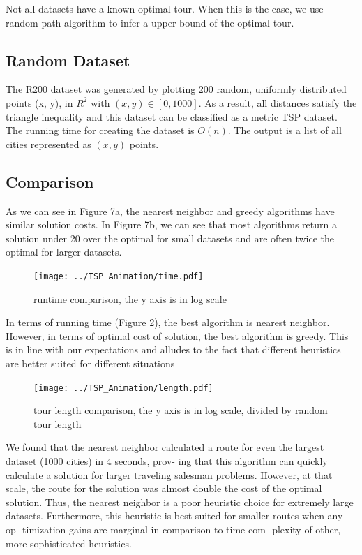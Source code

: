 \documentclass[10pt,twocolumn,letterpaper]{article}
\begin{document}
Not all datasets have a known optimal tour. When this is the case, we use random path algorithm to infer a upper bound of the optimal tour. 

\subsection{Random Dataset}
The R200 dataset was generated by plotting 200 random, 
uniformly distributed points (x, y), in $R^2$ with $(x, y) \in
[0, 1000]$. As a result, all
distances satisfy the triangle inequality and this dataset can
be classified as a metric TSP dataset. The running time
for creating the dataset is $O(n)$. 
The output is a list of all cities represented as $(x,y)$ points.

\subsection{Comparison}
As we can see in Figure 7a, the nearest neighbor and
greedy algorithms have similar solution costs. In Figure 7b,
we can see that most algorithms return a solution under 20%
over the optimal for small datasets and are often twice the
optimal for larger datasets.
\begin{figure}
\centering
\texttt{[image: ../TSP\_Animation/time.pdf]}
\caption{runtime comparison, the y axis is in log scale}
\label{fig:tsp}
\end{figure}

In terms of running time (Figure \ref{fig:length}), the best algorithm
is nearest neighbor. However, in terms of optimal cost of
solution, the best algorithm is greedy. This is in line with our
expectations and alludes to the fact that different heuristics
are better suited for different situations
\begin{figure}
	\centering
	\texttt{[image: ../TSP\_Animation/length.pdf]}
	\caption{tour length comparison, the y axis is in log scale, divided by random tour length}
	\label{fig:length}
\end{figure}
We found that the nearest neighbor calculated a route
for even the largest dataset (1000 cities) in 4 seconds, prov-
ing that this algorithm can quickly calculate a solution for
larger traveling salesman problems. However, at that scale,
the route for the solution was almost double the cost of
the optimal solution. Thus, the nearest neighbor is a poor
heuristic choice for extremely large datasets. Furthermore,
this heuristic is best suited for smaller routes when any op-
timization gains are marginal in comparison to time com-
plexity of other, more sophisticated heuristics.
\end{document}
